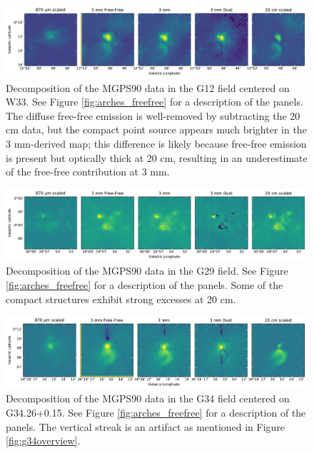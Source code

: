 \documentclass[twocolumn]{aastex62}
\begin{document}
\begin{figure}[htp]
    \includegraphics[width=17cm]{figures/G12_w33_5panel.pdf}
    \caption{Decomposition of the MGPS90 data in the G12 field centered on W33.
    See Figure \ref{fig:arches_freefree} for a description of the panels.
    The diffuse free-free emission is well-removed by subtracting the 20 cm data,
    but the compact point source appears much brighter in the 3 mm-derived map;
    this difference is likely because free-free emission is present but optically
    thick at 20 cm, resulting in an underestimate of the free-free contribution 
    at 3 mm.
}
\label{fig:w33freefree}
\end{figure}

\begin{figure}[htp]
    \includegraphics[width=17cm]{figures/G29_g29_5panel.pdf}
    \caption{Decomposition of the MGPS90 data in the G29 field.
    See Figure \ref{fig:arches_freefree} for a description of the panels.
    Some of the compact structures exhibit strong excesses at 20 cm.
}
\label{fig:g29freefree}
\end{figure}

\begin{figure}[htp]
    \includegraphics[width=17cm]{figures/G34_g34_5panel.pdf}
    \caption{Decomposition of the MGPS90 data in the G34 field centered on G34.26+0.15.
    See Figure \ref{fig:arches_freefree} for a description of the panels.
    The vertical streak is an artifact as mentioned in Figure \ref{fig:g34overview}.
}
\label{fig:g34freefree}
\end{figure}
\end{document}
